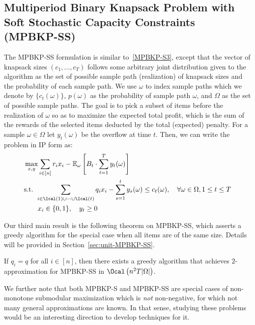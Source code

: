 \documentclass[11pt]{article}
\begin{document}
{ 
\subsection{Multiperiod Binary Knapsack Problem with Soft Stochastic Capacity Constraints (MPBKP-SS)}
The MPBKP-SS formulation is similar to~\eqref{MPBKP-S3}, except that the vector of knapsack sizes $(c_1, \ldots, c_T)$ follows some arbitrary joint distribution given to the algorithm as the set of possible sample path (realization) of knapsack sizes and the probability of each sample path. We use $\omega$ to index sample paths which we denote by $\{c_t(\omega)\}$, $p(\omega)$ as the probability of sample path $\omega$, and $\Omega$ as the set of possible sample paths. The goal is to pick a subset of items before the realization of $\omega$ so as to maximize the expected total profit, which is the sum of the rewards of the selected items deducted by the total (expected) penalty. For a sample $\omega\in\Omega$ let $y_t(\omega)$ be the overflow at time $t$. Then, we can write the problem in IP form as:
\begin{subequations}\label{MPBKP-SS}
\begin{align}
&\max_{x,y} \sum_{i\in[n]}r_ix_i - \mathbb{E}_\omega\left[B_t\cdot \sum_{t=1}^Ty_t(\omega)\right]\\
&\text{s.t. } \sum_{i\in\Ical(1)\cup\cdots\cup\Ical(t)}q_ix_i - \sum_{s=1}^ty_s(\omega) \le   c_t(\omega),\quad \forall \omega\in\Omega, 1\le t\le T\\
&\qquad x_i\in\{0,1\},\quad y_t\ge 0
\end{align}
\end{subequations}

Our third main result is the following theorem on MPBKP-SS, which asserts a greedy algorithm for the special case when all items are of the same size. Details will be provided in Section~\ref{sec:unit-MPBKP-SS}.
\begin{theorem}\label{mainthm3}
	If $q_i=q$ for all $i\in[n]$, then there exists a greedy algorithm that achieves $2$-approximation for MPBKP-SS in $\Ocal\left(n^2T|\Omega|\right)$.
\end{theorem}

We further note that both MPBKP-S and MPBKP-SS are special cases of non-monotone submodular maximization which is \emph{not} non-negative, for which not many general approximations are known. In that sense, studying these problems would be an interesting direction to develop techniques for it.
}
	
	
\end{document}
